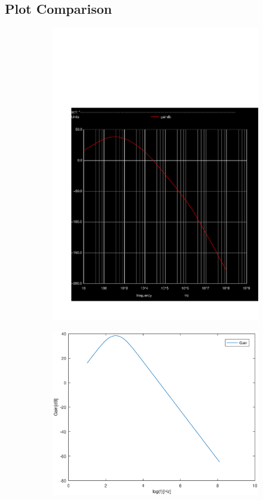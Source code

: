\subsection{Plot Comparison}

\vspace{-3cm}

\begin{figure}[H]
\centering
\begin{subfigure}{.45\textwidth}
  \centering
  \includegraphics[width=0.9\linewidth]{../sim/gain.pdf}
\end{subfigure}%
\begin{subfigure}{.55\textwidth}
  \centering
  \vspace{3cm}
  \includegraphics[width=1\linewidth]{gainteo.eps}

\end{subfigure}
\end{figure}
